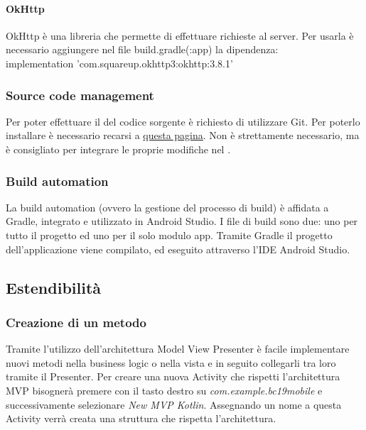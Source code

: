 \paragraph{OkHttp}
OkHttp è una libreria che permette di effettuare richieste al server.
Per usarla è necessario aggiungere nel file build.gradle(:app) la dipendenza:\\
implementation 'com.squareup.okhttp3:okhttp:3.8.1'


\subsubsection{Source code management}
Per poter effettuare il  del codice sorgente è richiesto di utilizzare Git. Per poterlo installare è necessario recarsi a \href{https://git-scm.com/downloads}{questa pagina}.
Non è strettamente necessario, ma è consigliato per integrare le proprie modifiche nel .

\subsubsection{Build automation}
La build automation (ovvero la gestione del processo di build) è affidata a Gradle, integrato e utilizzato in Android Studio. I file di build sono due: uno per tutto il progetto ed uno per il solo modulo app.
Tramite Gradle il progetto dell'applicazione viene compilato,  ed eseguito attraverso l'IDE Android Studio.


\subsection{Estendibilità}

\subsubsection{Creazione di un metodo}
Tramite l'utilizzo dell'architettura Model View Presenter è facile implementare nuovi metodi nella business logic o nella vista e in seguito collegarli tra loro tramite il Presenter.
Per creare una nuova Activity che rispetti l'architettura MVP bisognerà premere con il tasto destro su \textit{com.example.bc19mobile} e successivamente selezionare \textit{New MVP Kotlin}. Assegnando un nome a questa Activity verrà creata una struttura che rispetta l'architettura.


